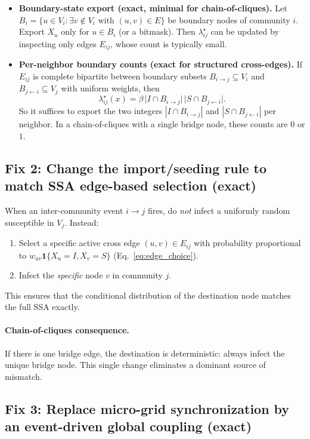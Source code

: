 \documentclass[11pt,a4paper]{article}
\begin{document}
\begin{itemize}[leftmargin=*]
\item \textbf{Boundary-state export (exact, minimal for chain-of-cliques).}
Let $B_i=\{u\in V_i:\exists v\notin V_i \text{ with } (u,v)\in E\}$ be boundary nodes of community $i$.
Export $X_u$ only for $u\in B_i$ (or a bitmask). Then $\lambda^{\star}_{ij}$ can be updated by inspecting only
edges $E_{ij}$, whose count is typically small.
\item \textbf{Per-neighbor boundary counts (exact for structured cross-edges).}
If $E_{ij}$ is complete bipartite between boundary subsets $B_{i\to j}\subseteq V_i$ and $B_{j\leftarrow i}\subseteq V_j$
with uniform weights, then
\begin{equation}
\lambda^{\star}_{ij}(x)=\beta\,\bigl|I\cap B_{i\to j}\bigr|\,\bigl|S\cap B_{j\leftarrow i}\bigr|.
\end{equation}
So it suffices to export the two integers $|I\cap B_{i\to j}|$ and $|S\cap B_{j\leftarrow i}|$ per neighbor.
In a chain-of-cliques with a single bridge node, these counts are $0$ or $1$.
\end{itemize}

\subsection{Fix 2: Change the import/seeding rule to match SSA edge-based selection (exact)}

When an inter-community event $i\to j$ fires, do \emph{not} infect a uniformly random susceptible in $V_j$.
Instead:
\begin{enumerate}[leftmargin=*]
\item Select a specific active cross edge $(u,v)\in E_{ij}$ with probability proportional to
$w_{uv}\mathbf{1}\{X_u=I, X_v=S\}$ (Eq.~\eqref{eq:edge_choice}).
\item Infect the \emph{specific} node $v$ in community $j$.
\end{enumerate}
This ensures that the conditional distribution of the destination node matches the full SSA exactly.

\paragraph{Chain-of-cliques consequence.}
If there is one bridge edge, the destination is deterministic: always infect the unique bridge node. This
single change eliminates a dominant source of mismatch.

\subsection{Fix 3: Replace micro-grid synchronization by an event-driven global coupling (exact)}
\label{sec:fix3}
\end{document}
